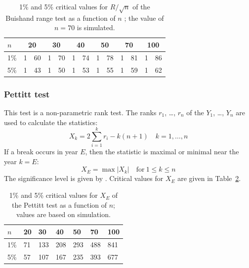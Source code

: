 \documentclass[a4paper,11pt]{article}
\begin{document}
\begin{table}[!ht]
\begin{center}
\caption{1\% and 5\% critical values for $R/\sqrt{n}$ of the Buishand
range test as a function of $n$ \citep{buishand1982}; the value of
$n=70$ is simulated.}
\label{tab:bhr}
\begin{tabular}{l r@{.}l r@{.}l r@{.}l r@{.}l r@{.}l r@{.}l}
\hline
$n$ & \multicolumn{2}{c}{20} & \multicolumn{2}{c}{30} & \multicolumn{2}{c}{40} & \multicolumn{2}{c}{50} & \multicolumn{2}{c}{70} & \multicolumn{2}{c}{100}\\
\hline
1\% & 1&60 & 1&70 & 1&74 & 1&78 & 1&81 & 1&86\\
5\% & 1&43 & 1&50 & 1&53 & 1&55 & 1&59 & 1&62\\
\end{tabular}
\end{center}
\end{table}


\subsubsection{Pettitt test}
\label{sec:pet}

This test is a non-parametric rank test. The ranks $r_1$, \dots, $r_n$
of the $Y_1$, \ldots, $Y_n$ are used to calculate the statistics:
\begin{equation*}
X_k = 2 \sum_{i=1}^{k} r_i - k(n+1) \quad k = 1, \ldots, n
\end{equation*}
If a break occurs in year $E$, then the statistic is maximal or minimal near the year $k=E$:
\begin{equation*}
X_E = \max \vert X_k \vert  \quad \mathrm{for}\: 1 \leq k \leq n 
\end{equation*}
The significance level is given by \citet{pettitt}. Critical values
for $X_E$ are given in Table~\ref{tab:pettitt}.

\begin{table}[!ht]
\begin{center}
\caption{1\% and 5\% critical values for $X_E$ of the Pettitt test as
a function of $n$; values are based on simulation.}
\label{tab:pettitt}
\begin{tabular}{l l l l l l l}
\hline
$n$ & 20 & 30 & 40 & 50 & 70 & 100\\
\hline
1\% & 71 & 133 & 208 & 293 & 488 & 841 \\
5\% & 57 & 107 & 167 & 235 & 393 & 677 \\
\end{tabular}
\end{center}
\end{table}
\end{document}
